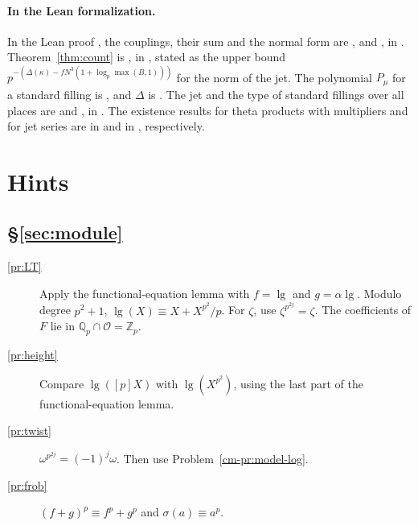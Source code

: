 \documentclass[reqno]{amsart}
\theoremstyle{definition}
\theoremstyle{plain}
\newcommand{\Z}{\mathbb{Z}}
\newcommand{\Q}{\mathbb{Q}}
\newcommand{\Oc}{\mathcal{O}}
\newcommand{\lgg}{\operatorname{lg}}
\begin{document}
\paragraph{In the Lean formalization.}
\begin{sloppypar}
In the Lean proof \cite{GL}, the couplings, their sum and the normal form are ,  and , in .  Theorem~\ref{thm:count} is , in , stated as the upper bound \(p^{-(\Delta(\kappa) - f N^3 (1 + \log_p \max(B,1)))}\) for the norm of the jet.  The polynomial \(P_\mu\) for a standard filling is , and \(\Delta\) is .  The jet and the type of standard fillings over all places are  and , in .  The existence results for theta products with multipliers and for jet series are  in  and  in , respectively.
\end{sloppypar}

\section*{Hints}

\subsection*{\S\ref{sec:module}}
\begin{description}
\item[\ref{pr:LT}] Apply the functional-equation lemma with \(f = \lgg\) and \(g = \alpha\lgg\).  Modulo degree \(p^2+1\), \(\lgg(X) \equiv X + X^{p^2}/p\).  For \(\zeta\), use \(\zeta^{p^{2j}} = \zeta\).  The coefficients of \(F\) lie in \(\Q_p \cap \Oc = \Z_p\).
\item[\ref{pr:height}] Compare \(\lgg([p]X)\) with \(\lgg(X^{p^2})\), using the last part of the functional-equation lemma.
\item[\ref{pr:twist}] \(\omega^{p^{2j}} = (-1)^j \omega\).  Then use Problem~\ref{cm-pr:model-log}.
\item[\ref{pr:frob}] \((f + g)^p \equiv f^p + g^p\) and \(\sigma(a) \equiv a^p\).
\end{description}
\end{document}
